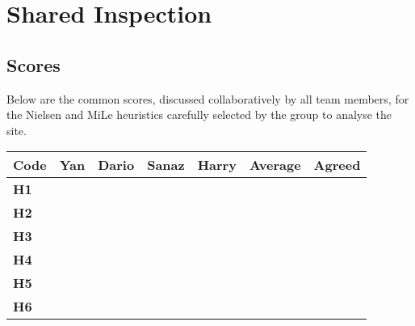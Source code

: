 \section{Shared Inspection}
\subsection{Scores}
Below are the common scores, discussed collaboratively by all team members, for the Nielsen and MiLe heuristics carefully selected by the group to analyse the site.\\
\begin{table}[htp!]
    \centering
    \begin{tabular}{ |l|c|c|c|c|c|c| }
        \hline
        \textbf{Code} & \textbf{Yan} & \textbf{Dario} & \textbf{Sanaz} & \textbf{Harry} & \textbf{Average} & \textbf{Agreed}\\
        \hline
        \textbf{H1} & \textbf{\color{unicefOrange}{3}} & \textbf{\color{unicefOrange}{3}} & \textbf{\color{unicefOrange}{3.5}} & \textbf{\color{unicefRed}{2}} & \textbf{\color{unicefRed}{2.875}} & \textbf{\color{unicefOrange}{3}}\\
        \hline
        \textbf{H2} & \textbf{\color{unicefGreen}{4}} & \textbf{\color{unicefGreen}{5}} & \textbf{\color{unicefGreen}{4}} & \textbf{\color{unicefGreen}{5}} & \textbf{\color{unicefGreen}{4.5}} & \textbf{\color{unicefGreen}{4.5}}\\
        \hline
        \textbf{H3} & \textbf{\color{unicefGreen}{4}} & \textbf{\color{unicefRed}{2}} & \textbf{\color{unicefGreen}{4}} & \textbf{\color{unicefOrange}{3}} & \textbf{\color{unicefOrange}{3.25}} & \textbf{\color{unicefOrange}{3}}\\
        \hline
        \textbf{H4} & \textbf{\color{unicefGreen}{4}} & \textbf{\color{unicefGreen}{5}} & \textbf{\color{unicefGreen}{4}} & \textbf{\color{unicefGreen}{5}} & \textbf{\color{unicefGreen}{4.5}} & \textbf{\color{unicefGreen}{4.5}}\\
        \hline
        \textbf{H5} & \textbf{\color{unicefGreen}{4}} & \textbf{\color{unicefGreen}{4}} & \textbf{\color{unicefGreen}{4.5}} & \textbf{\color{unicefGreen}{5}} & \textbf{\color{unicefGreen}{4.375}} & \textbf{\color{unicefGreen}{4.5}}\\
        \hline
        \textbf{H6} & \textbf{\color{unicefGreen}{4}} & \textbf{\color{unicefGreen}{5}} & \textbf{\color{unicefGreen}{4.5}} & \textbf{\color{unicefGreen}{4}} & \textbf{\color{unicefGreen}{4.375}} & \textbf{\color{unicefGreen}{5}}\\

\end{tabular}
\end{table}
